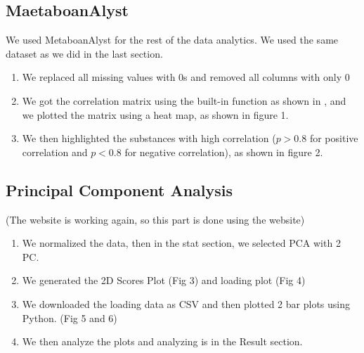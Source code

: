 \documentclass{article}
\begin{document}
\subsection*{MaetaboanAlyst}
We used MetaboanAlyst for the rest of the data analytics.  We used the same dataset as we did in the last section. 


\begin{enumerate}
    We uploaded the CSV file to AetaboanAlyst with one var statistical analytics with the data type of concentration and sample of "rows (unpaired)." 
    We then skipped the missing value filling.
    We then normalized the data with "auto-scaling"
    In the statistical analysis model, we selected correlation. Then the website crashed. When I tried to reconnect, it said connection refused. It did go back for a while, but because of the unstableness, we moved on to using Python to do these analytics. 
     We load the data into the Pandas data frame, since correlation is independent then normalization, we don't need to normalize our data in this step.
    \item We replaced all missing values with 0s and removed all columns with only 0
    \item We got the correlation matrix using the built-in function as shown in \cite{pandaCo}, and we plotted the matrix using a heat map, as shown in figure 1.
    \item We then highlighted the substances with high correlation ($p>0.8$ for positive correlation and $p<0.8$ for negative correlation), as shown in figure 2.
    
\end{enumerate}

\subsection*{Principal Component Analysis}
(The website is working again, so this part is done using the website)
\begin{enumerate}
    \item We normalized the data, then in the stat section, we selected PCA with 2 PC.
    \item We generated the 2D Scores Plot (Fig 3) and loading plot (Fig 4)
    \item We downloaded the loading data as CSV and then plotted 2 bar plots using Python. (Fig 5 and 6)
    \item We then analyze the plots and analyzing is in the Result section. 
\end{enumerate}
\end{document}
